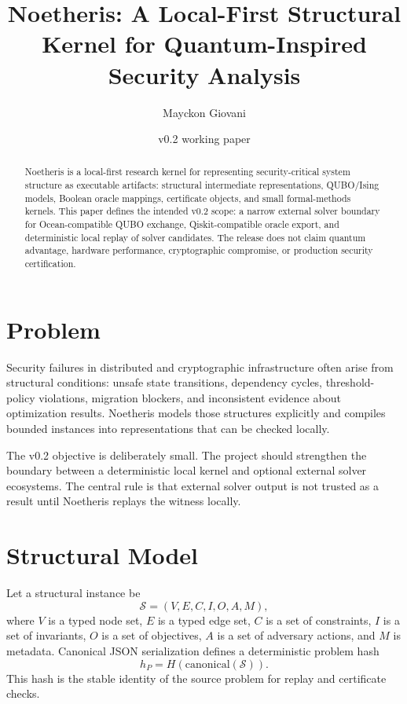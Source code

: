 \documentclass[11pt]{article}
\title{Noetheris: A Local-First Structural Kernel for Quantum-Inspired Security Analysis}
\author{Mayckon Giovani}
\date{v0.2 working paper}
\begin{document}
\maketitle

\begin{abstract}
Noetheris is a local-first research kernel for representing security-critical
system structure as executable artifacts: structural intermediate
representations, QUBO/Ising models, Boolean oracle mappings, certificate
objects, and small formal-methods kernels. This paper defines the intended
v0.2 scope: a narrow external solver boundary for Ocean-compatible QUBO
exchange, Qiskit-compatible oracle export, and deterministic local replay of
solver candidates. The release does not claim quantum advantage, hardware
performance, cryptographic compromise, or production security certification.
\end{abstract}

\section{Problem}

Security failures in distributed and cryptographic infrastructure often arise
from structural conditions: unsafe state transitions, dependency cycles,
threshold-policy violations, migration blockers, and inconsistent evidence
about optimization results. Noetheris models those structures explicitly and
compiles bounded instances into representations that can be checked locally.

The v0.2 objective is deliberately small. The project should strengthen the
boundary between a deterministic local kernel and optional external solver
ecosystems. The central rule is that external solver output is not trusted as a
result until Noetheris replays the witness locally.

\section{Structural Model}

Let a structural instance be
\[
  \mathcal{S} = (V, E, C, I, O, A, M),
\]
where $V$ is a typed node set, $E$ is a typed edge set, $C$ is a set of
constraints, $I$ is a set of invariants, $O$ is a set of objectives, $A$ is a
set of adversary actions, and $M$ is metadata. Canonical JSON serialization
defines a deterministic problem hash
\[
  h_P = H(\mathrm{canonical}(\mathcal{S})).
\]
This hash is the stable identity of the source problem for replay and
certificate checks.
\end{document}
